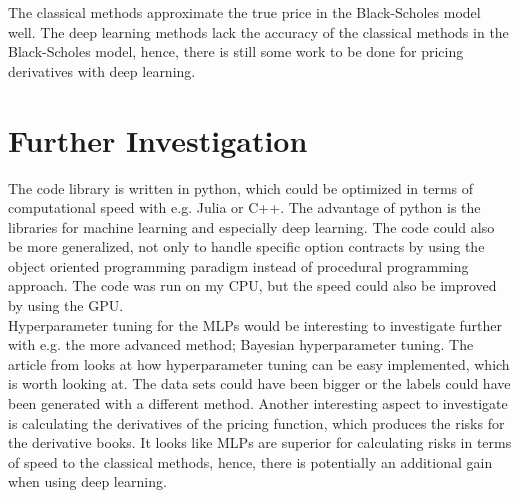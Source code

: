 The classical methods approximate the true price in the Black-Scholes model well. The deep learning methods lack the accuracy of the classical methods in the Black-Scholes model, hence, there is still some work to be done for pricing derivatives with deep learning. 

\section{Further Investigation}
The code library is written in python, which could be optimized in terms of computational speed with e.g. Julia or C++. The advantage of python is the libraries for machine learning and especially deep learning. The code could also be more generalized, not only to handle specific option contracts by using the object oriented programming paradigm instead of procedural programming approach. The code was run on my CPU, but the speed could also be improved by using the GPU.\\

Hyperparameter tuning for the MLPs would be interesting to investigate further with e.g. the more advanced method; Bayesian hyperparameter tuning. The article from \parencite{liaw2018tune} looks at how hyperparameter tuning can be easy implemented, which is worth looking at. The data sets could have been bigger or the labels could have been generated with a different method. Another interesting aspect to investigate is calculating the derivatives of the pricing function, which produces the risks for the derivative books. It looks like MLPs are superior for calculating risks in terms of speed to the classical methods, hence, there is potentially an additional gain when using deep learning.\\


